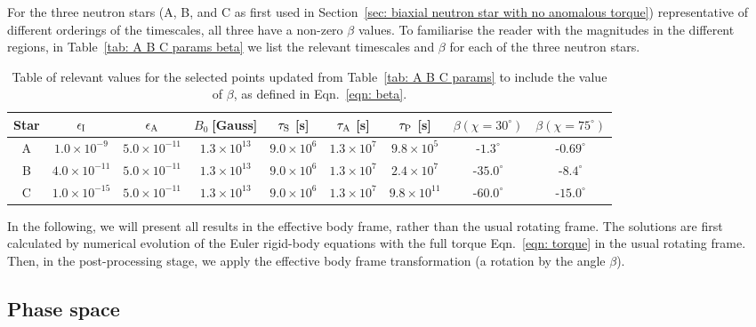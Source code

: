 \documentclass[../full_thesis/full_thesis.tex]{subfiles}
\begin{document}
For the three neutron stars (A, B, and C as first used in Section~\ref{sec:
biaxial neutron star with no anomalous torque}) representative of different orderings of
the timescales, all three have a non-zero $\beta$ values. To familiarise the
reader with the magnitudes in the different regions, in Table~\ref{tab: A B C
params beta} we list the relevant timescales and $\beta$ for each of the three
neutron stars.
\begin{table}[ht]
{\footnotesize
\centering
\tabcolsep=0.11cm
	\begin{tabular}[ht]{|c|c|c|c|c|c|c|c|c|}\hline
Star &  $\epsilon_{\mathrm{I}}$  & $\epsilon_{\mathrm{A}} $ & 	$B_{0} \; $[Gauss] & $\tau_{\mathrm{S}}$ [s] & $\tau_{\mathrm{A}}$ [s] & $ \tau_{\mathrm{P}}$  [s] & $\beta (\chi=30^{\circ})$ & $\beta(\chi=75^{\circ})$ \\ \hline
A & $ {1.0}{\times} 10^{-9} $ & $ {5.0}{\times} 10^{-11} $ & $ {1.3}{\times} 10^{13} $ & $ {9.0}{\times} 10^{6} $ & $ {1.3}{\times} 10^{7} $ & $ {9.8}{\times} 10^{5} $ & $ \text{-}1.3^{\circ} $& $ \text{-}0.69^{\circ} $ \\
B & $ {4.0}{\times} 10^{-11} $ & $ {5.0}{\times} 10^{-11} $ & $ {1.3}{\times} 10^{13} $ & $ {9.0}{\times} 10^{6} $ & $ {1.3}{\times} 10^{7} $ & $ {2.4}{\times} 10^{7} $ & $ \text{-}35.0^{\circ} $& $ \text{-}8.4^{\circ} $ \\
C & $ {1.0}{\times} 10^{-15} $ & $ {5.0}{\times} 10^{-11} $ & $ {1.3}{\times} 10^{13} $ & $ {9.0}{\times} 10^{6} $ & $ {1.3}{\times} 10^{7} $ & $ {9.8}{\times} 10^{11} $ & $ \text{-}60.0^{\circ} $& $ \text{-}15.0^{\circ} $ \\ \hline
\end{tabular}}
\caption{Table of relevant values for the selected points updated from
Table~\ref{tab: A B C params} to include the value of $\beta$, as defined in
Eqn.~\eqref{eqn: beta}.}
\label{tab: A B C params beta}
\end{table}

In the following, we will present all results in the effective body frame,
rather than the usual rotating frame. The solutions are first calculated by
numerical evolution of the Euler rigid-body equations with the full torque
Eqn.~\eqref{eqn: torque} in the usual rotating frame. Then, in the
post-processing stage, we apply the effective body frame transformation (a
rotation by the angle $\beta$).

\subsection{Phase space}
\end{document}

